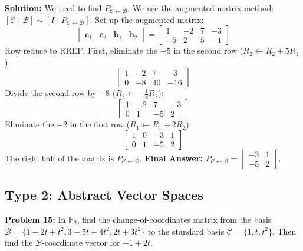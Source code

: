 \documentclass[11pt]{article}
\begin{document}
\textbf{Solution:}
We need to find $P_{\mathcal{C} \leftarrow \mathcal{B}}$. We use the augmented matrix method: $[ \mathcal{C} \mid \mathcal{B} ] \sim [ I \mid P_{\mathcal{C} \leftarrow \mathcal{B}} ]$.
Set up the augmented matrix:
\[ \begin{bmatrix} \mathbf{c}_1 & \mathbf{c}_2 \mid \mathbf{b}_1 & \mathbf{b}_2 \end{bmatrix} = \begin{bmatrix} 1 & -2 & 7 & -3 \\ -5 & 2 & 5 & -1 \end{bmatrix} \]
Row reduce to RREF. First, eliminate the $-5$ in the second row ($R_2 \leftarrow R_2 + 5R_1$):
\[ \begin{bmatrix} 1 & -2 & 7 & -3 \\ 0 & -8 & 40 & -16 \end{bmatrix} \]
Divide the second row by $-8$ ($R_2 \leftarrow -\frac{1}{8}R_2$):
\[ \begin{bmatrix} 1 & -2 & 7 & -3 \\ 0 & 1 & -5 & 2 \end{bmatrix} \]
Eliminate the $-2$ in the first row ($R_1 \leftarrow R_1 + 2R_2$):
\[ \begin{bmatrix} 1 & 0 & -3 & 1 \\ 0 & 1 & -5 & 2 \end{bmatrix} \]
The right half of the matrix is $P_{\mathcal{C} \leftarrow \mathcal{B}}$.
\textbf{Final Answer:} $P_{\mathcal{C} \leftarrow \mathcal{B}} = \begin{bmatrix} -3 & 1 \\ -5 & 2 \end{bmatrix}$.

\subsection{Type 2: Abstract Vector Spaces}

\textbf{Problem 15:} In $\mathbb{P}_2$, find the change-of-coordinates matrix from the basis $\mathcal{B} = \{1-2t+t^2, 3-5t+4t^2, 2t+3t^2\}$ to the standard basis $\mathcal{C} = \{1, t, t^2\}$. Then find the $\mathcal{B}$-coordinate vector for $-1+2t$.
\end{document}

